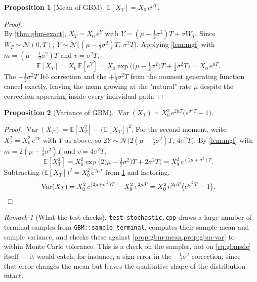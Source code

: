 \documentclass[11pt]{article}
\newcommand{\E}{\mathbb{E}}
\newcommand{\Var}{\operatorname{Var}}
\theoremstyle{plain}
\newtheorem{proposition}{Proposition}
\theoremstyle{definition}
\theoremstyle{remark}
\newtheorem{remark}{Remark}
\begin{document}
\begin{proposition}[Mean of GBM]\label{prop:gbm-mean}
$\E[X_T] = X_0\,e^{\mu T}$.
\end{proposition}

\begin{proof}
\leavevmode\\
By \cref{thm:gbm-exact}, $X_T=X_0\,e^Y$ with
$Y=(\mu-\tfrac12\sigma^2)T+\sigma W_T$. Since $W_T\sim\mathcal N(0,T)$,
$Y\sim\mathcal N\big((\mu-\tfrac12\sigma^2)T,\ \sigma^2 T\big)$. Applying
\cref{lem:mgf} with $m=(\mu-\tfrac12\sigma^2)T$ and $v=\sigma^2 T$,
\[
   \E[X_T] = X_0\,\E[e^Y]
           = X_0\exp\!\Big( \big(\mu-\tfrac12\sigma^2\big)T + \tfrac12\sigma^2 T \Big)
           = X_0\,e^{\mu T}.
\]
The $-\tfrac12\sigma^2 T$ It\^o correction and the $+\tfrac12\sigma^2 T$
from the moment generating function cancel exactly, leaving the mean
growing at the "natural" rate $\mu$ despite the correction appearing
inside every individual path.
\end{proof}

\begin{proposition}[Variance of GBM]\label{prop:gbm-var}
$\Var(X_T) = X_0^2\,e^{2\mu T}\big(e^{\sigma^2 T}-1\big)$.
\end{proposition}

\begin{proof}
$\Var(X_T)=\E[X_T^2]-\big(\E[X_T]\big)^2$. For the second moment, write
$X_T^2=X_0^2\,e^{2Y}$ with $Y$ as above, so $2Y\sim\mathcal
N\big(2(\mu-\tfrac12\sigma^2)T,\ 4\sigma^2 T\big)$. By \cref{lem:mgf}
with $m=2(\mu-\tfrac12\sigma^2)T$ and $v=4\sigma^2 T$,
\[
   \E[X_T^2] = X_0^2\exp\!\Big( 2\big(\mu-\tfrac12\sigma^2\big)T + 2\sigma^2 T \Big)
             = X_0^2\,e^{(2\mu+\sigma^2)T}.
\]
Subtracting $\big(\E[X_T]\big)^2=X_0^2\,e^{2\mu T}$ from
\cref{prop:gbm-mean} and factoring,
\[
   \Var(X_T) = X_0^2\,e^{(2\mu+\sigma^2)T} - X_0^2\,e^{2\mu T}
             = X_0^2\,e^{2\mu T}\big(e^{\sigma^2 T}-1\big). \qedhere
\]
\end{proof}

\begin{remark}[What the test checks]
\texttt{test\_stochastic.cpp} draws a large number of terminal samples
from \texttt{GBM::sample\_terminal}, computes their sample mean and
sample variance, and checks these against
\cref{prop:gbm-mean,prop:gbm-var} to within Monte Carlo tolerance. This
is a check on the sampler, not on \eqref{eq:gbmsde} itself ---
it would catch, for instance, a sign error in the $-\tfrac12\sigma^2$
correction, since that error changes the mean but leaves the
qualitative shape of the distribution intact.
\end{remark}



\end{document}
